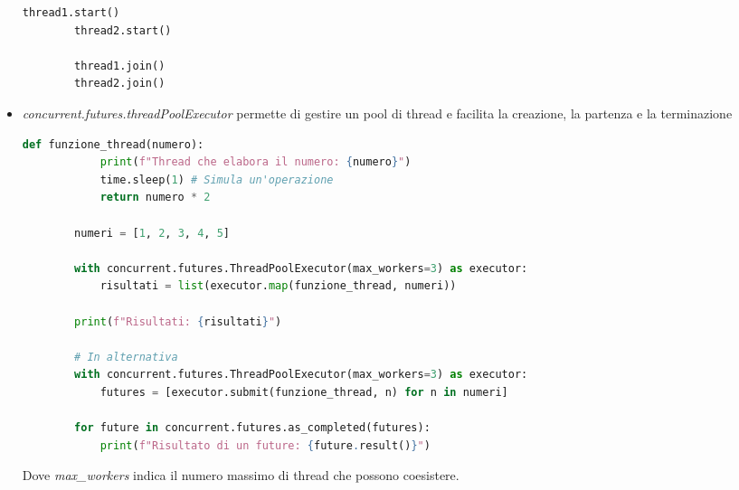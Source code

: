 \begin{itemize}
\begin{lstlisting}[language=Python]
		thread1.start()
		thread2.start()
		
		thread1.join()
		thread2.join()
	\end{lstlisting}
	\item \textit{concurrent.futures.threadPoolExecutor} permette di gestire un pool di thread e facilita la creazione, la partenza e la terminazione
	\begin{lstlisting}[language=Python]	
		def funzione_thread(numero):
			print(f"Thread che elabora il numero: {numero}")
			time.sleep(1) # Simula un'operazione
			return numero * 2
			
		numeri = [1, 2, 3, 4, 5]
		
		with concurrent.futures.ThreadPoolExecutor(max_workers=3) as executor:
			risultati = list(executor.map(funzione_thread, numeri))
		
		print(f"Risultati: {risultati}")
		
		# In alternativa
		with concurrent.futures.ThreadPoolExecutor(max_workers=3) as executor:
			futures = [executor.submit(funzione_thread, n) for n in numeri]
		
		for future in concurrent.futures.as_completed(futures):
			print(f"Risultato di un future: {future.result()}")
	\end{lstlisting}
	Dove \textit{max\_workers} indica il numero massimo di thread che possono coesistere.
\end{itemize}

